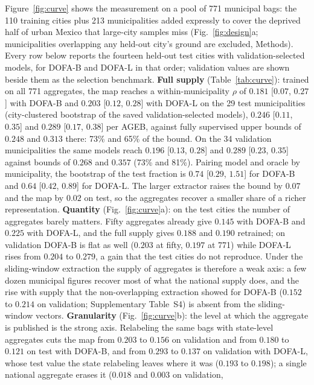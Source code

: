 \documentclass[11pt]{article}
\begin{document}
Figure~\ref{fig:curve} shows the measurement on a pool of 771 municipal bags: the 110
training cities plus 213 municipalities added expressly to cover the deprived half of
urban Mexico that large-city samples miss (Fig.~\ref{fig:design}a; municipalities
overlapping any held-out city's ground are excluded, Methods). Every row below reports
the fourteen held-out test cities with validation-selected models, for DOFA-B and
DOFA-L in that order; validation values are shown beside them as the selection
benchmark. \textbf{Full supply} (Table~\ref{tab:curve}): trained on all 771 aggregates,
the map reaches a within-municipality $\rho$ of $0.181$ [$0.07$, $0.27$] with DOFA-B and
$0.203$ [$0.12$, $0.28$] with DOFA-L on the 29 test municipalities (city-clustered
bootstrap of the saved validation-selected models), $0.246$ [$0.11$, $0.35$] and $0.289$
[$0.17$, $0.38$] per AGEB, against fully supervised upper bounds of $0.248$ and $0.313$
there: 73\% and 65\% of the bound. On the 34 validation municipalities the same models
reach $0.196$ [$0.13$, $0.28$] and $0.289$ [$0.23$, $0.35$] against bounds of $0.268$
and $0.357$ (73\% and 81\%). Pairing model and oracle by municipality, the bootstrap of
the test fraction is $0.74$ [$0.29$, $1.51$] for DOFA-B and $0.64$ [$0.42$, $0.89$] for
DOFA-L. The larger extractor raises the bound by $0.07$ and the map by $0.02$ on test,
so the aggregates recover a smaller share of a richer representation.
\textbf{Quantity} (Fig.~\ref{fig:curve}a): on the test cities the number of aggregates
barely matters. Fifty aggregates already give $0.145$ with DOFA-B and $0.225$ with
DOFA-L, and the full supply gives $0.188$ and $0.190$ retrained; on validation DOFA-B is
flat as well ($0.203$ at fifty, $0.197$ at 771) while DOFA-L rises from $0.204$ to
$0.279$, a gain that the test cities do not reproduce. Under the sliding-window
extraction the supply of aggregates is therefore a weak axis: a few dozen municipal
figures recover most of what the national supply does, and the rise with supply that
the non-overlapping extraction showed for DOFA-B ($0.152$ to $0.214$ on validation;
Supplementary Table~S4) is absent from the sliding-window vectors. \textbf{Granularity} (Fig.~\ref{fig:curve}b): the
level at which the aggregate is published is the strong axis. Relabeling the same bags
with state-level aggregates cuts the map from $0.203$ to $0.156$ on validation and
from $0.180$ to $0.121$ on test with DOFA-B, and from $0.293$ to $0.137$ on validation
with DOFA-L, whose test value the state relabeling leaves where it was ($0.193$ to
$0.198$); a single national aggregate erases it ($0.018$ and $0.003$ on validation,
\end{document}
